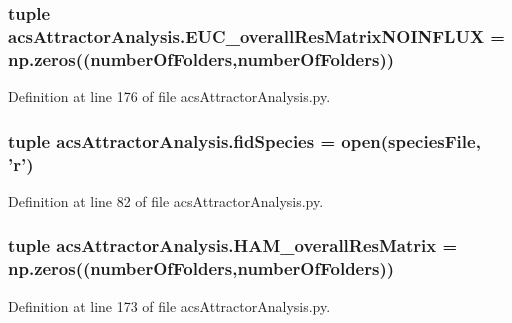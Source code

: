 \hypertarget{a00090_a4214c876be4247f0643fc749beb35787}{
\subsubsection[{E\-U\-C\-\_\-overall\-Res\-Matrix\-N\-O\-I\-N\-F\-L\-U\-X}]{\setlength{\rightskip}{0pt plus 5cm}tuple acs\-Attractor\-Analysis.\-E\-U\-C\-\_\-overall\-Res\-Matrix\-N\-O\-I\-N\-F\-L\-U\-X = np.\-zeros(({\bf number\-Of\-Folders},{\bf number\-Of\-Folders}))}}\label{a00090_a4214c876be4247f0643fc749beb35787}


Definition at line 176 of file acs\-Attractor\-Analysis.\-py.

\hypertarget{a00090_a604c9f75892d8d8aeac8306c94630a23}{
\subsubsection[{fid\-Species}]{\setlength{\rightskip}{0pt plus 5cm}tuple acs\-Attractor\-Analysis.\-fid\-Species = open({\bf species\-File}, '{\bf r}')}}\label{a00090_a604c9f75892d8d8aeac8306c94630a23}


Definition at line 82 of file acs\-Attractor\-Analysis.\-py.

\hypertarget{a00090_a46dc8cdfb545b64952370e51ff02336f}{
\subsubsection[{H\-A\-M\-\_\-overall\-Res\-Matrix}]{\setlength{\rightskip}{0pt plus 5cm}tuple acs\-Attractor\-Analysis.\-H\-A\-M\-\_\-overall\-Res\-Matrix = np.\-zeros(({\bf number\-Of\-Folders},{\bf number\-Of\-Folders}))}}\label{a00090_a46dc8cdfb545b64952370e51ff02336f}


Definition at line 173 of file acs\-Attractor\-Analysis.\-py.

